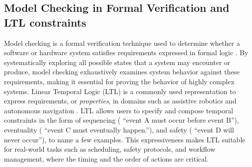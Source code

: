 \subsection{Model Checking in Formal Verification and LTL constraints}\label{hello}

Model checking is a formal verification technique used to determine whether a software or hardware system satisfies requirements expressed in formal logic \cite{baier2008principles}. By systematically exploring all possible states that a system may encounter or produce, model checking exhaustively examines system behavior against these requirements, making it essential for proving the behavior of highly complex systems. Linear Temporal Logic (LTL) is a commonly used representation to express requirements, or \textit{properties}, in domains such as assistive robotics \cite{dixon2014fridge} and autonomous navigation \cite{liu2023grounding}. LTL allows users to specify and compose temporal constraints in the form of sequencing (\ie{} ``event A must occur before event B''), eventuality (\ie{} ``event C must eventually happen.''), and safety (\ie{} ``event D will never occur''), to name a few examples. This expressiveness makes LTL suitable for real-world tasks such as scheduling, safety protocols, and workflow management, where the timing and the order of actions are critical. %





